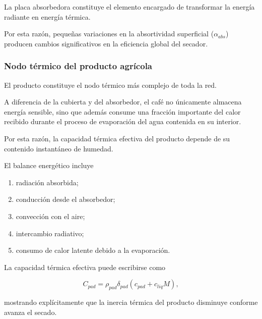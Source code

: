 \begin{tcolorbox}[title=Observación,colback=green!3,colframe=green!50!black]

La placa absorbedora constituye el elemento encargado de transformar la energía radiante en energía térmica.

Por esta razón, pequeñas variaciones en la absortividad superficial ($\alpha_{abs}$) producen cambios significativos en la eficiencia global del secador.

\end{tcolorbox}

\subsubsection{Nodo térmico del producto agrícola}

El producto constituye el nodo térmico más complejo de toda la red.

A diferencia de la cubierta y del absorbedor, el café no únicamente almacena energía sensible, sino que además consume una fracción importante del calor recibido durante el proceso de evaporación del agua contenida en su interior.

Por esta razón, la capacidad térmica efectiva del producto depende de su contenido instantáneo de humedad.

El balance energético incluye

\begin{enumerate}

\item radiación absorbida;

\item conducción desde el absorbedor;

\item convección con el aire;

\item intercambio radiativo;

\item consumo de calor latente debido a la evaporación.

\end{enumerate}

La capacidad térmica efectiva puede escribirse como

\[
C_{pad}
=
\rho_{pad}\delta_{pad}
(c_{pad}+c_{liq}M),
\]

mostrando explícitamente que la inercia térmica del producto disminuye conforme avanza el secado.

